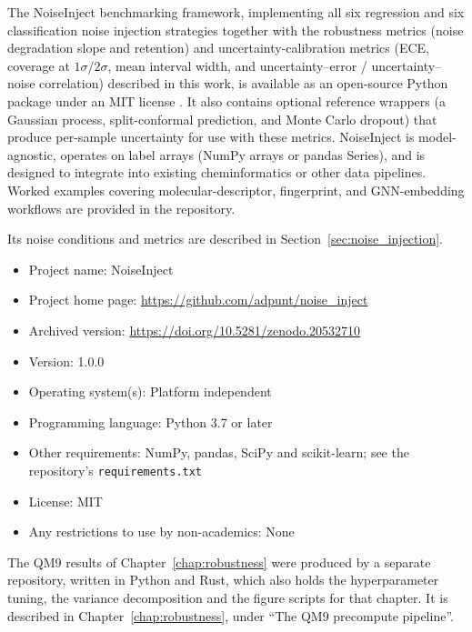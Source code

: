 The NoiseInject benchmarking framework, implementing all six regression and six classification noise injection strategies together with the robustness metrics (noise degradation slope and retention) and uncertainty-calibration metrics (ECE, coverage at $1\sigma$/$2\sigma$, mean interval width, and uncertainty--error / uncertainty--noise correlation) described in this work, is available as an open-source Python package under an MIT license \citep{noiseinject}. It also contains optional reference wrappers (a Gaussian process, split-conformal prediction, and Monte Carlo dropout) that produce per-sample uncertainty for use with these metrics. NoiseInject is model-agnostic, operates on label arrays (NumPy arrays or pandas Series), and is designed to integrate into existing cheminformatics or other data pipelines. Worked examples covering molecular-descriptor, fingerprint, and GNN-embedding workflows are provided in the repository.

Its noise conditions and metrics are described in Section~\ref{sec:noise_injection}.

\begin{itemize}
    \item Project name: NoiseInject
    \item Project home page: \url{https://github.com/adpunt/noise_inject}
    \item Archived version: \url{https://doi.org/10.5281/zenodo.20532710}
    \item Version: 1.0.0
    \item Operating system(s): Platform independent
    \item Programming language: Python 3.7 or later
    \item Other requirements: NumPy, pandas, SciPy and scikit-learn; see the repository's \texttt{requirements.txt}
    \item License: MIT
    \item Any restrictions to use by non-academics: None
\end{itemize}

The QM9 results of Chapter~\ref{chap:robustness} were produced by a separate repository, written in Python and Rust, which also holds the hyperparameter tuning, the variance decomposition and the figure scripts for that chapter. It is described in Chapter~\ref{chap:robustness}, under ``The QM9 precompute pipeline''.

